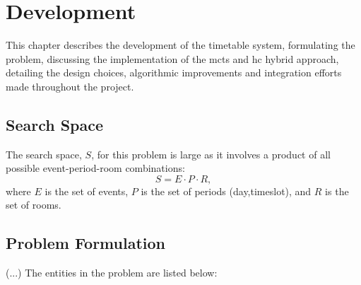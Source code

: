 
\chapter{Development}


\label{Development}

This chapter describes the development of the timetable system, formulating the problem, discussing the implementation of the \ac{mcts} and \ac{hc} hybrid approach, detailing the design choices, algorithmic improvements and integration efforts made throughout the project.

\section{Search Space}

The search space, \(S\),  for this problem is large as it involves a product of all possible event-period-room combinations: \[S = E \cdot P  \cdot R,\] where \(E\) is the set of events, \(P\) is the set of periods (day,timeslot), and \(R\) is the set of rooms.

\section{Problem Formulation}

(...)
The entities in the problem are listed below:

